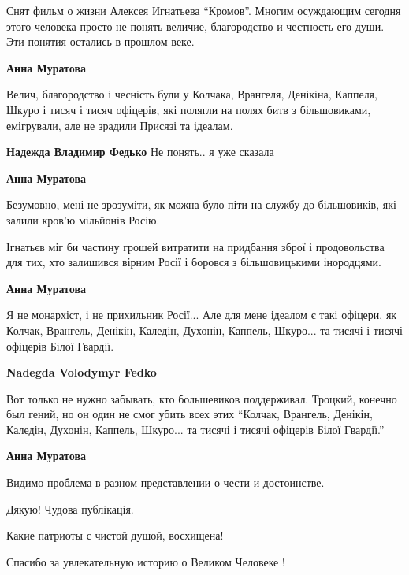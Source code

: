 \begin{itemize}

Снят фильм о жизни Алексея Игнатьева \enquote{Кромов}. Многим осуждающим сегодня этого
человека просто не понять величие, благородство и честность его души. Эти
понятия остались в прошлом веке.

\begin{itemize} %
\textbf{Анна Муратова} 

Велич, благородство і чесність були у Колчака, Врангеля, Денікіна, Каппеля,
Шкуро і тисяч і тисяч офіцерів, які полягли на полях битв з більшовиками,
емігрували, але не зрадили Присязі та ідеалам.

\begin{itemize} %
\textbf{Надежда Владимир Федько} Не понять.. я уже сказала

\textbf{Анна Муратова} 

Безумовно, мені не зрозуміти, як можна було піти на службу до більшовиків, які
залили кров'ю мільйонів Росію.

Ігнатьєв міг би частину грошей витратити на придбання зброї і продовольства для
тих, хто залишився вірним Росії і боровся з більшовицькими інородцями.

\textbf{Анна Муратова} 

Я не монархіст, і не прихильник Росії... Але для мене ідеалом є такі офіцери,
як Колчак, Врангель, Денікін, Каледін, Духонін, Каппель, Шкуро... та тисячі і
тисячі офіцерів Білої Гвардії.

\textbf{Nadegda Volodymyr Fedko} 

Вот только не нужно забывать, кто большевиков поддерживал. Троцкий, конечно был
гений, но он один не смог убить всех этих \enquote{Колчак, Врангель, Денікін, Каледін,
Духонін, Каппель, Шкуро... та тисячі і тисячі офіцерів Білої Гвардії.}

\textbf{Анна Муратова}

Видимо проблема в разном представлении о чести и достоинстве.
\end{itemize} %

\end{itemize} %

Дякую! Чудова публікація.

Какие патриоты с чистой душой, восхищена!

Спасибо за увлекательную историю о Великом Человеке !


\end{itemize}
